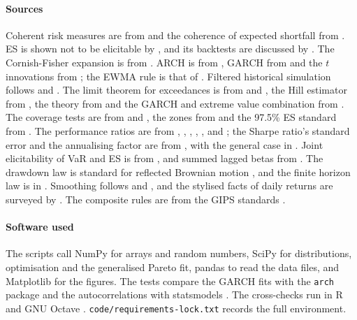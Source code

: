 \begin{chapterrefs}
\paragraph{Sources}
Coherent risk measures are from \textcite{artzner1999} and the coherence of expected shortfall from
\textcite{acerbi2002}. ES is shown not to be elicitable by \textcite{gneiting2011}, and its
backtests are discussed by \textcite{acerbi2014}. The Cornish-Fisher expansion is from \textcite{cornish1938}. ARCH is from
\textcite{engle1982}, GARCH from \textcite{bollerslev1986} and the $t$ innovations from
\textcite{bollerslev1987}; the EWMA rule is that of \textcite{riskmetrics1996}. Filtered historical
simulation follows \textcite{barone1999} and \textcite{hull1998}. The limit theorem for exceedances is
from \textcite{balkema1974} and \textcite{pickands1975}, the Hill estimator from \textcite{hill1975},
the theory from \textcite{embrechts1997} and the GARCH and extreme value combination from
\textcite{mcneil2000}. The coverage tests are from \textcite{kupiec1995} and
\textcite{christoffersen1998}, the zones from \textcite{bcbs1996} and the 97.5\% ES standard from
\textcite{bcbs2019}. The performance ratios are from \textcite{sharpe1966,sharpe1994},
\textcite{treynor1965}, \textcite{jensen1968}, \textcite{modigliani1997}, \textcite{sortino1994},
\textcite{keating2002} and \textcite{goetzmann2007}; the Sharpe ratio's standard error and the
annualising factor are from \textcite{lo2002}, with the general case in \textcite{opdyke2007}. Joint
elicitability of VaR and ES is from \textcite{fissler2016}, and summed lagged betas from
\textcite{dimson1979}. The
drawdown law is standard for reflected Brownian motion \parencite{harrison1985}, and the finite
horizon law is in \textcite{magdon2004}. Smoothing follows \textcite{geltner1993} and
\textcite{getmansky2004}, and the stylised facts of daily returns are surveyed by \textcite{cont2001}.
The composite rules are from the GIPS standards \parencite{gips2019}.

\paragraph{Software used}
The scripts call NumPy \parencite{numpy} for arrays and random numbers, SciPy \parencite{scipy}
for distributions, optimisation and the generalised Pareto fit, pandas \parencite{pandas} to read the
data files, and Matplotlib \parencite{matplotlib} for the figures. The tests compare the GARCH fits
with the \texttt{arch} package \parencite{arch} and the autocorrelations with statsmodels
\parencite{statsmodels}. The cross-checks run in R \parencite{rcore} and GNU Octave \parencite{octave}. \texttt{code/requirements-lock.txt} records the full environment.


\end{chapterrefs}
